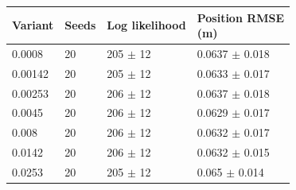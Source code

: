\begin{tabular}{llll}
\toprule
Variant & Seeds & Log likelihood & \shortstack[l]{Position RMSE\\(m)} \\
\midrule
0.0008 & 20 & 205 $\pm$ 12 & 0.0637 $\pm$ 0.018 \\
0.00142 & 20 & 205 $\pm$ 12 & 0.0633 $\pm$ 0.017 \\
0.00253 & 20 & 206 $\pm$ 12 & 0.0637 $\pm$ 0.018 \\
0.0045 & 20 & 206 $\pm$ 12 & 0.0629 $\pm$ 0.017 \\
0.008 & 20 & 206 $\pm$ 12 & 0.0632 $\pm$ 0.017 \\
0.0142 & 20 & 206 $\pm$ 12 & 0.0632 $\pm$ 0.015 \\
0.0253 & 20 & 205 $\pm$ 12 & 0.065 $\pm$ 0.014 \\
\bottomrule
\end{tabular}
